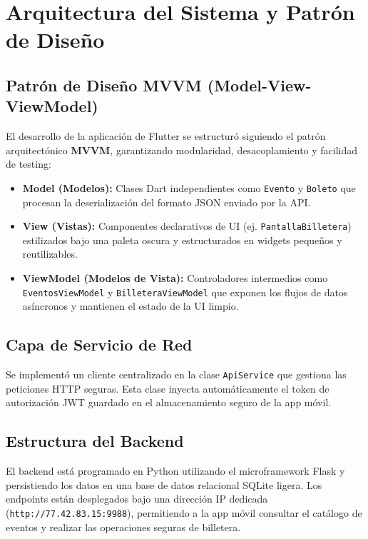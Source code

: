 \section{Arquitectura del Sistema y Patrón de Diseño}

\subsection{Patrón de Diseño MVVM (Model-View-ViewModel)}
El desarrollo de la aplicación de Flutter se estructuró siguiendo el patrón arquitectónico \textbf{MVVM}, garantizando modularidad, desacoplamiento y facilidad de testing:

\begin{itemize}
    \item \textbf{Model (Modelos):} Clases Dart independientes como \texttt{Evento} y \texttt{Boleto} que procesan la deserialización del formato JSON enviado por la API.
    \item \textbf{View (Vistas):} Componentes declarativos de UI (ej. \texttt{PantallaBilletera}) estilizados bajo una paleta oscura y estructurados en widgets pequeños y reutilizables.
    \item \textbf{ViewModel (Modelos de Vista):} Controladores intermedios como \texttt{EventosViewModel} y \texttt{BilleteraViewModel} que exponen los flujos de datos asíncronos y mantienen el estado de la UI limpio.
\end{itemize}

\subsection{Capa de Servicio de Red}
Se implementó un cliente centralizado en la clase \texttt{ApiService} que gestiona las peticiones HTTP seguras. Esta clase inyecta automáticamente el token de autorización JWT guardado en el almacenamiento seguro de la app móvil.

\subsection{Estructura del Backend}
El backend está programado en Python utilizando el microframework Flask y persistiendo los datos en una base de datos relacional SQLite ligera. Los endpoints están desplegados bajo una dirección IP dedicada (\texttt{http://77.42.83.15:9988}), permitiendo a la app móvil consultar el catálogo de eventos y realizar las operaciones seguras de billetera.

